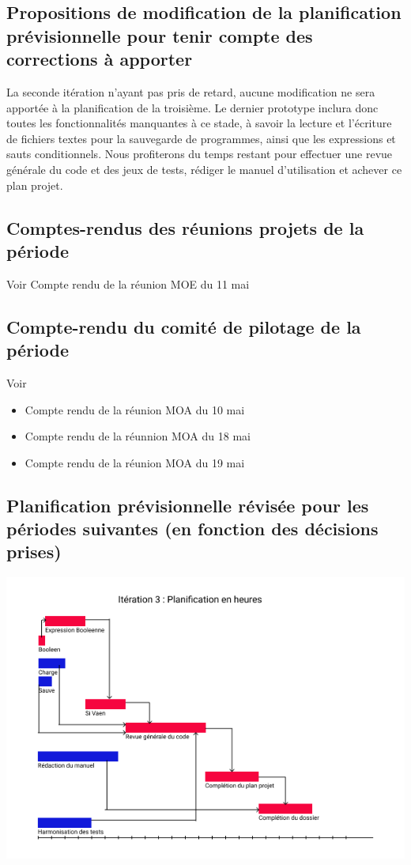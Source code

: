 \documentclass[12pt,a4paper,titlepage,openany, oneside]{report}
\begin{document}
    \subsection{Propositions de modification de la planification prévisionnelle pour tenir compte des corrections à apporter}
        La seconde itération n'ayant pas pris de retard, aucune modification ne sera
        apportée à la planification de la troisième. Le dernier prototype inclura donc
        toutes les fonctionnalités manquantes à ce stade, à savoir la lecture et l'écriture
        de fichiers textes pour la sauvegarde de programmes, ainsi que les expressions
        et sauts conditionnels. Nous profiterons du temps restant pour effectuer une
        revue générale du code et des jeux de tests, rédiger le manuel d'utilisation et
        achever ce plan projet.

    \subsection{Comptes-rendus des réunions projets de la période}
        Voir Compte rendu de la réunion MOE du 11 mai
    \subsection{Compte-rendu du comité de pilotage de la période}
        Voir
        \begin{itemize}
            \item Compte rendu de la réunion MOA du 10 mai
            \item Compte rendu de la réunnion MOA du 18 mai
            \item Compte rendu de la réunion MOA du 19 mai
        \end{itemize}


    \subsection{Planification prévisionnelle révisée pour les périodes suivantes (en fonction des décisions prises)}

    \includegraphics[scale=0.75]{fichiers/planification/iteration3/iteration3Planif.png}
\end{document}
